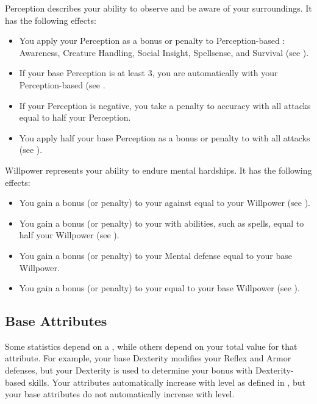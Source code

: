         \label{Perception}
        {
            Perception describes your ability to observe and be aware of your surroundings.
            It has the following effects:
            \begin{itemize}
                \item You apply your Perception as a bonus or penalty to Perception-based : Awareness, Creature Handling, Social Insight, Spellsense, and Survival (see ).
                \item If your base Perception is at least 3, you are automatically  with your Perception-based  (see .
                \item If your Perception is negative, you take a penalty to accuracy with all attacks equal to half your Perception.
                \item You apply half your base Perception as a bonus or penalty to  with all attacks (see ).
            \end{itemize}
        }

        \label{Willpower}
        {
            Willpower represents your ability to endure mental hardships.
            It has the following effects:
            \begin{itemize}
                \item You gain a bonus (or penalty) to your  against  equal to your Willpower (see ).
                \item You gain a bonus (or penalty) to your  with  abilities, such as spells, equal to half your Willpower (see ).
                \item You gain a bonus (or penalty) to your Mental defense equal to your base Willpower.
                \item You gain a bonus (or penalty) to your  equal to your base Willpower (see ).
            \end{itemize}
        }

    \subsection{Base Attributes}\label{Base Attributes}
        Some statistics depend on a , while others depend on your total value for that attribute.
        For example, your base Dexterity modifies your Reflex and Armor defenses, but your Dexterity is used to determine your bonus with Dexterity-based skills.
        Your attributes automatically increase with level as defined in , but your base attributes do not automatically increase with level.

